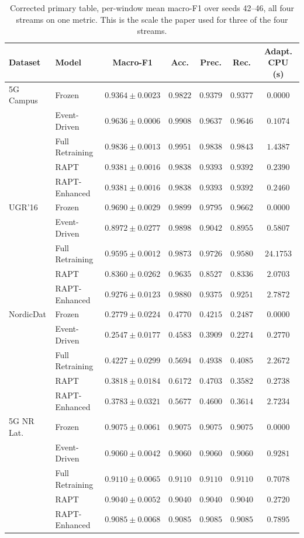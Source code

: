 \begin{table}[t]
\caption{Corrected primary table, per-window mean macro-F1 over seeds 42--46, all four streams on one metric. This is the scale the paper used for three of the four streams.}
\label{tab:primary_pw}
\centering
\scriptsize
\begin{tabular}{@{}llccccc@{}}
\toprule
\textbf{Dataset} & \textbf{Model} & \textbf{Macro-F1} & \textbf{Acc.} & \textbf{Prec.} & \textbf{Rec.} & \textbf{Adapt. CPU (s)} \\
\midrule
5G Campus & Frozen & $0.9364 \pm 0.0023$ & $0.9822$ & $0.9379$ & $0.9377$ & $0.0000$ \\
 & Event-Driven & $0.9636 \pm 0.0006$ & $0.9908$ & $0.9637$ & $0.9646$ & $0.1074$ \\
 & Full Retraining & $0.9836 \pm 0.0013$ & $0.9951$ & $0.9838$ & $0.9843$ & $1.4387$ \\
 & RAPT & $0.9381 \pm 0.0016$ & $0.9838$ & $0.9393$ & $0.9392$ & $0.2390$ \\
 & RAPT-Enhanced & $0.9381 \pm 0.0016$ & $0.9838$ & $0.9393$ & $0.9392$ & $0.2460$ \\
\midrule
UGR'16 & Frozen & $0.9690 \pm 0.0029$ & $0.9899$ & $0.9795$ & $0.9662$ & $0.0000$ \\
 & Event-Driven & $0.8972 \pm 0.0277$ & $0.9898$ & $0.9042$ & $0.8955$ & $0.5807$ \\
 & Full Retraining & $0.9595 \pm 0.0012$ & $0.9873$ & $0.9726$ & $0.9580$ & $24.1753$ \\
 & RAPT & $0.8360 \pm 0.0262$ & $0.9635$ & $0.8527$ & $0.8336$ & $2.0703$ \\
 & RAPT-Enhanced & $0.9276 \pm 0.0123$ & $0.9880$ & $0.9375$ & $0.9251$ & $2.7872$ \\
\midrule
NordicDat & Frozen & $0.2779 \pm 0.0224$ & $0.4770$ & $0.4215$ & $0.2487$ & $0.0000$ \\
 & Event-Driven & $0.2547 \pm 0.0177$ & $0.4583$ & $0.3909$ & $0.2274$ & $0.2770$ \\
 & Full Retraining & $0.4227 \pm 0.0299$ & $0.5694$ & $0.4938$ & $0.4085$ & $2.2672$ \\
 & RAPT & $0.3818 \pm 0.0184$ & $0.6172$ & $0.4703$ & $0.3582$ & $0.2738$ \\
 & RAPT-Enhanced & $0.3783 \pm 0.0321$ & $0.5677$ & $0.4600$ & $0.3614$ & $2.7234$ \\
\midrule
5G NR Lat. & Frozen & $0.9075 \pm 0.0061$ & $0.9075$ & $0.9075$ & $0.9075$ & $0.0000$ \\
 & Event-Driven & $0.9060 \pm 0.0042$ & $0.9060$ & $0.9060$ & $0.9060$ & $0.9281$ \\
 & Full Retraining & $0.9110 \pm 0.0065$ & $0.9110$ & $0.9110$ & $0.9110$ & $0.7078$ \\
 & RAPT & $0.9040 \pm 0.0052$ & $0.9040$ & $0.9040$ & $0.9040$ & $0.2720$ \\
 & RAPT-Enhanced & $0.9085 \pm 0.0068$ & $0.9085$ & $0.9085$ & $0.9085$ & $0.7895$ \\
\bottomrule
\end{tabular}
\end{table}
